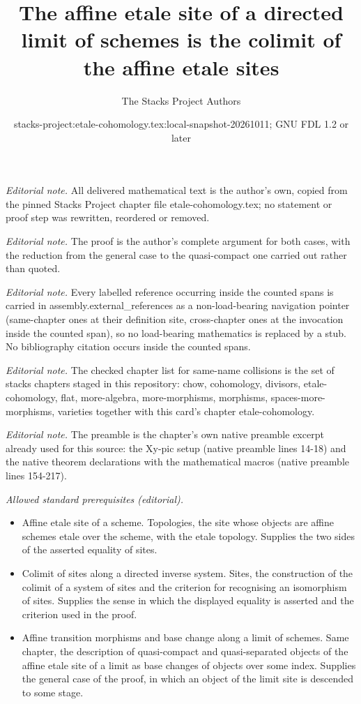 \documentclass[10pt,a4paper]{amsart}
\title{The affine etale site of a directed limit of schemes is the colimit of the affine etale sites}
\author{The Stacks Project Authors}
\date{stacks-project:etale-cohomology.tex:local-snapshot-20261011; GNU FDL 1.2 or later}
\theoremstyle{plain}
\theoremstyle{definition}
\theoremstyle{remark}
\numberwithin{equation}{subsection}
\begin{document}
\maketitle
\noindent\textit{Editorial note.} All delivered mathematical text is the author's own, copied from the pinned Stacks Project chapter file etale-cohomology.tex; no statement or proof step was rewritten, reordered or removed.\par\medskip
\noindent\textit{Editorial note.} The proof is the author's complete argument for both cases, with the reduction from the general case to the quasi-compact one carried out rather than quoted.\par\medskip
\noindent\textit{Editorial note.} Every labelled reference occurring inside the counted spans is carried in assembly.external\_references as a non-load-bearing navigation pointer (same-chapter ones at their definition site, cross-chapter ones at the invocation inside the counted span), so no load-bearing mathematics is replaced by a stub. No bibliography citation occurs inside the counted spans.\par\medskip
\noindent\textit{Editorial note.} The checked chapter list for same-name collisions is the set of stacks chapters staged in this repository: chow, cohomology, divisors, etale-cohomology, flat, more-algebra, more-morphisms, morphisms, spaces-more-morphisms, varieties together with this card's chapter etale-cohomology.\par\medskip
\noindent\textit{Editorial note.} The preamble is the chapter's own native preamble excerpt already used for this source: the Xy-pic setup (native preamble lines 14-18) and the native theorem declarations with the mathematical macros (native preamble lines 154-217).\par\medskip
\noindent\textit{Allowed standard prerequisites (editorial).}\begin{itemize}
\item Affine etale site of a scheme. Topologies, the site whose objects are affine schemes etale over the scheme, with the etale topology. Supplies the two sides of the asserted equality of sites.
\item Colimit of sites along a directed inverse system. Sites, the construction of the colimit of a system of sites and the criterion for recognising an isomorphism of sites. Supplies the sense in which the displayed equality is asserted and the criterion used in the proof.
\item Affine transition morphisms and base change along a limit of schemes. Same chapter, the description of quasi-compact and quasi-separated objects of the affine etale site of a limit as base changes of objects over some index. Supplies the general case of the proof, in which an object of the limit site is descended to some stage.
\end{itemize}\medskip
\end{document}
